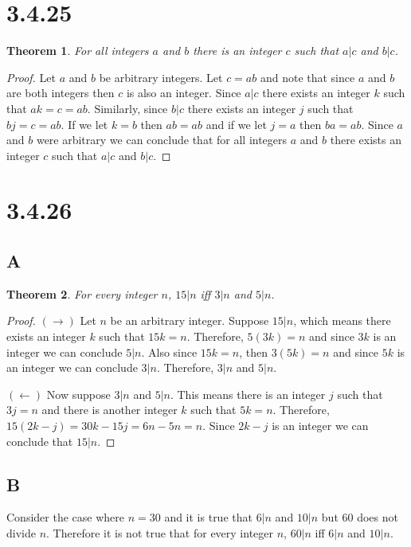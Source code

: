 \documentclass{article}
\newtheorem*{theorem}{Theorem}  %
\begin{document}
\section*{3.4.25}
\begin{theorem} For all integers $a$ and $b$ there is an integer $c$ such that $a|c$ and $b|c$.
\end{theorem}
\begin{proof}
Let $a$ and $b$ be arbitrary integers. Let $c = ab$ and note that since $a$ and $b$ are both integers then $c$ is also an integer. Since $a|c$ there exists an integer $k$ such that $ak = c = ab$. Similarly, since $b|c$ there exists an integer $j$ such that $bj = c = ab$. If we let $k = b$ then $ab = ab$ and if we let $j = a$ then $ba = ab$. Since $a$ and $b$ were arbitrary we can conclude that for all integers $a$ and $b$ there exists an integer $c$ such that $a|c$ and $b|c$.
\end{proof}

\section*{3.4.26}

\subsection*{A}
\begin{theorem} For every integer $n$, $15|n$ iff $3|n$ and $5|n$.
\end{theorem}
\begin{proof}
$(\rightarrow)$ Let $n$ be an arbitrary integer. Suppose $15|n$, which means there exists an integer $k$ such that $15k = n$. Therefore, $5(3k) = n$ and since $3k$ is an integer we can conclude $5|n$. Also since $15k = n$, then $3(5k) = n$ and since $5k$ is an integer we can conclude $3|n$. Therefore, $3|n$ and $5|n$.

$(\leftarrow)$ Now suppose $3|n$ and $5|n$. This means there is an integer $j$ such that $3j = n$ and there is another integer $k$ such that $5k = n$. Therefore, $15(2k-j) = 30k - 15j = 6n - 5n = n$. Since $2k-j$ is an integer we can conclude that $15|n$.

\end{proof}

\subsection*{B}
Consider the case where $n = 30$ and it is true that $6|n$ and $10|n$ but $60$ does not divide $n$. Therefore it is not true that for every integer $n$, $60|n$ iff $6|n$ and $10|n$.
\end{document}
